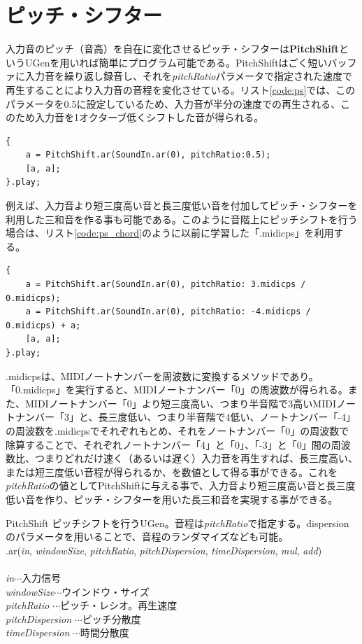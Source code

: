 \documentclass{jsarticle}
\begin{document}
\section{ピッチ・シフター}
入力音のピッチ（音高）を自在に変化させるピッチ・シフターは{\bf PitchShift}というUGenを用いれば簡単にプログラム可能である。PitchShiftはごく短いバッファに入力音を繰り返し録音し、それを{\it pitchRatio}パラメータで指定された速度で再生することにより入力音の音程を変化させている。リスト\ref{code:ps}では、このパラメータを0.5に設定しているため、入力音が半分の速度での再生される、このため入力音を1オクターブ低くシフトした音が得られる。

\begin{lstlisting}[caption=ピッチ・シフター, label=code:ps]
{
	a = PitchShift.ar(SoundIn.ar(0), pitchRatio:0.5);
	[a, a];
}.play;
\end{lstlisting}

例えば、入力音より短三度高い音と長三度低い音を付加してピッチ・シフターを利用した三和音を作る事も可能である。このように音階上にピッチシフトを行う場合は、リスト\ref{code:ps_chord}のように以前に学習した「.midicps」を利用する。

\begin{lstlisting}[caption=ピッチ・シフターによる和音, label=code:ps_chord]
{
	a = PitchShift.ar(SoundIn.ar(0), pitchRatio: 3.midicps / 0.midicps);
	a = PitchShift.ar(SoundIn.ar(0), pitchRatio: -4.midicps / 0.midicps) + a;
	[a, a];
}.play;
\end{lstlisting}

.midicpsは、MIDIノートナンバーを周波数に変換するメソッドであり。「0.midicps」を実行すると、MIDIノートナンバー「0」の周波数が得られる。また、MIDIノートナンバー「0」より短三度高い、つまり半音階で3高いMIDIノートナンバー「3」と、長三度低い、つまり半音階で4低い、ノートナンバー「-4」の周波数を.midicpsでそれぞれもとめ、それをノートナンバー「0」の周波数で除算することで、それぞれノートナンバー「4」と「0」、「-3」と「0」間の周波数比、つまりどれだけ速く（あるいは遅く）入力音を再生すれば、長三度高い、または短三度低い音程が得られるか、を数値として得る事ができる。これを{\it pitchRatio}の値としてPitchShiftに与える事で、入力音より短三度高い音と長三度低い音を作り、ピッチ・シフターを用いた長三和音を実現する事ができる。

\begin{itembox}[l]{PitchShift}
{\footnotesize 
ピッチシフトを行うUGen。音程は{\it pitchRatio}で指定する。dispersionのパラメータを用いることで、音程のランダマイズなども可能。\\
.ar({\it in}, {\it windowSize}, {\it pitchRatio}, {\it pitchDispersion}, {\it timeDispersion}, {\it mul}, {\it add})\\\\
{\it in}$\cdots$入力信号\\
{\it windowSize}$\cdots$ウインドウ・サイズ\\
{\it pitchRatio} $\cdots$ピッチ・レシオ。再生速度\\
{\it pitchDispersion} $\cdots$ピッチ分散度\\
{\it timeDispersion} $\cdots$時間分散度\\
}
\end{itembox}
\end{document}

